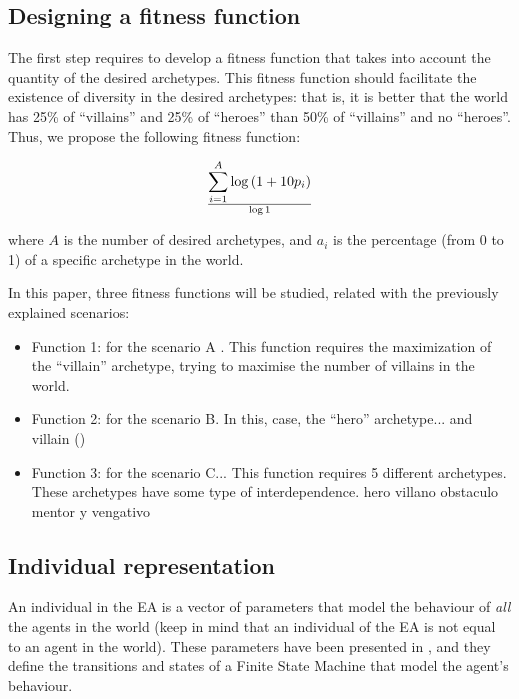 \documentclass[runningheads,a4paper]{llncs}
\begin{document}
\subsection{Designing a fitness function}

The first step requires to develop a fitness function that takes into
account the quantity of the desired archetypes. This fitness function
should facilitate the existence of diversity in the desired
archetypes: that is, it is better that the world has 25\% of
``villains'' and 25\% of ``heroes'' than 50\% of ``villains'' and no
``heroes''. Thus, we propose the following fitness function: 

\begin{equation}
\sum _{i=1}^{A} {\log \left( 1+10p_{i}\right) } \over {\log 1}
\end{equation}

where $A$ is the number of desired archetypes, and $a_{i}$ is the
percentage (from 0 to 1) of a specific archetype in the world. %

In this paper, three fitness functions will be studied, related with the previously explained scenarios:
\begin{itemize}
\item Function 1: for the scenario A . This function requires the maximization of the ``villain'' archetype, trying to maximise the number of villains in the world. 
\item Function 2: for the scenario B. In this, case, the ``hero'' archetype... and villain ()
\item Function 3: for the scenario C... This function requires 5 different archetypes. These archetypes have some type of interdependence. hero villano obstaculo mentor y vengativo %
\end{itemize}

\subsection{Individual representation}

An individual in the EA is a vector of parameters that model the behaviour of {\em all} the agents in the world (keep in mind that an individual of the EA is not equal to an agent in the world). These parameters have been presented in \cite{garcia14my}, and they define the transitions and states of a Finite State Machine that model the agent's behaviour. 
\end{document}
